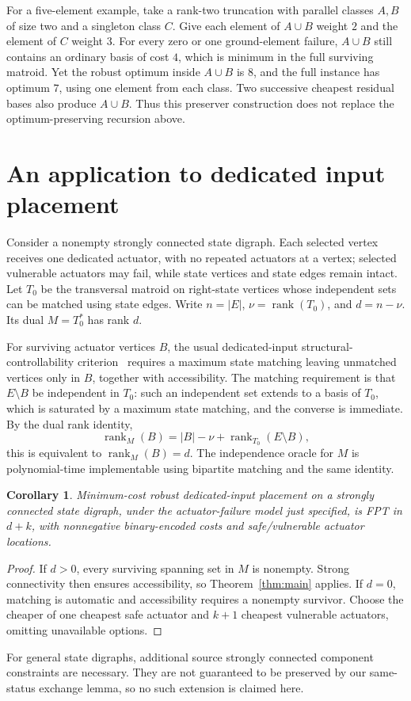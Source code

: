 \documentclass[11pt]{article}
\newtheorem{corollary}[theorem]{Corollary}
\theoremstyle{definition}\newtheorem{definition}[theorem]{Definition}
\theoremstyle{remark}\newtheorem{remark}[theorem]{Remark}
\DeclareMathOperator{\rk}{rank}
\begin{document}
For a five-element example, take a rank-two truncation with parallel classes $A,B$ of size two and a singleton class $C$. Give each element of $A\cup B$ weight $2$ and the element of $C$ weight $3$. For every zero or one ground-element failure, $A\cup B$ still contains an ordinary basis of cost $4$, which is minimum in the full surviving matroid. Yet the robust optimum inside $A\cup B$ is $8$, and the full instance has optimum $7$, using one element from each class. Two successive cheapest residual bases also produce $A\cup B$. Thus this preserver construction does not replace the optimum-preserving recursion above.

\section{An application to dedicated input placement}
Consider a nonempty strongly connected state digraph. Each selected vertex receives one dedicated actuator, with no repeated actuators at a vertex; selected vulnerable actuators may fail, while state vertices and state edges remain intact. Let $T_0$ be the transversal matroid on right-state vertices whose independent sets can be matched using state edges. Write $n=|E|$, $\nu=\rk(T_0)$, and $d=n-\nu$. Its dual $M=T_0^*$ has rank $d$.

For surviving actuator vertices $B$, the usual dedicated-input structural-controllability criterion~\cite{PKA} requires a maximum state matching leaving unmatched vertices only in $B$, together with accessibility. The matching requirement is that $E\setminus B$ be independent in $T_0$: such an independent set extends to a basis of $T_0$, which is saturated by a maximum state matching, and the converse is immediate. By the dual rank identity,
\[
 \rk_M(B)=|B|-\nu+\rk_{T_0}(E\setminus B),
\]
this is equivalent to $\rk_M(B)=d$. The independence oracle for $M$ is polynomial-time implementable using bipartite matching and the same identity.

\begin{corollary}
Minimum-cost robust dedicated-input placement on a strongly connected state digraph, under the actuator-failure model just specified, is FPT in $d+k$, with nonnegative binary-encoded costs and safe/vulnerable actuator locations.
\end{corollary}
\begin{proof}
If $d>0$, every surviving spanning set in $M$ is nonempty. Strong connectivity then ensures accessibility, so Theorem~\ref{thm:main} applies. If $d=0$, matching is automatic and accessibility requires a nonempty survivor. Choose the cheaper of one cheapest safe actuator and $k+1$ cheapest vulnerable actuators, omitting unavailable options.
\end{proof}
For general state digraphs, additional source strongly connected component constraints are necessary. They are not guaranteed to be preserved by our same-status exchange lemma, so no such extension is claimed here.
\end{document}
